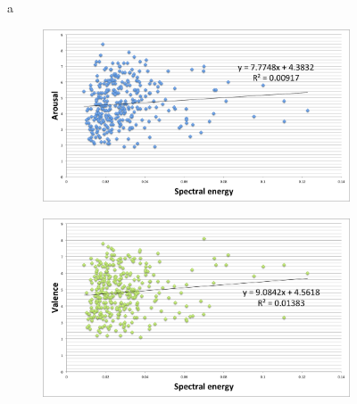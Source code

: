 \begin{figure}
		\vspace{-60pt}a
       
      \centering
        \begin{subfigure}[b]{0.48\textwidth}
                \includegraphics[width=\textwidth]{Figures/spectralenergy-arousal}
			   \vspace{20pt}
        \end{subfigure}
        \begin{subfigure}[b]{0.48\textwidth}
                \includegraphics[width=\textwidth]{Figures/spectralenergy-valence}
                  \vspace{20pt}
        \end{subfigure}        
        

\end{figure}
